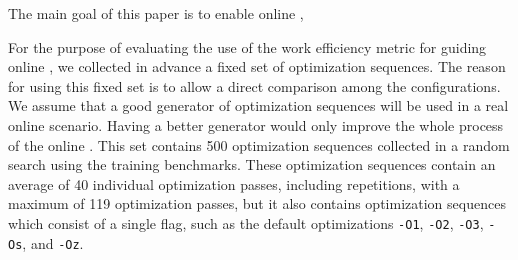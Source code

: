 The main goal of this paper is to enable online {\itercomp},

For the purpose of evaluating the use of the work efficiency metric for guiding
online {\itercomp}, we collected in advance a fixed set of optimization sequences.
The reason for using this fixed set is to allow a direct comparison among the configurations.
We assume that a good generator of optimization sequences will be used in a real online scenario.
Having a better generator would only improve the whole process of the online {\itercomp}.
This set contains 500 optimization sequences collected in a random search using the training benchmarks.
These optimization sequences contain an average of 40 individual optimization passes,
including repetitions, with a maximum of 119 optimization passes, but it also contains
optimization sequences which consist of a single flag, such as the default optimizations
\texttt{-O1}, \texttt{-O2}, \texttt{-O3}, \texttt{-Os}, and \texttt{-Oz}.


